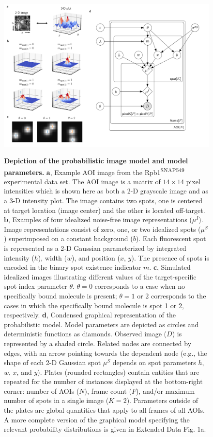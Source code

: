 \begin{figure}[h]
\centering
\includegraphics[width=\textwidth]{figures/figure2.png}
\label{fig:tapqir_model}
\caption{\textbf{Depiction of the probabilistic image model and model parameters.} \textbf{a}, Example AOI image from the Rpb1\textsuperscript{SNAP549} experimental data set. The AOI image is a matrix of $14 \times 14$ pixel intensities which is shown here as both a 2-D grayscale image and as a 3-D intensity plot. The image contains two spots, one is centered at target location (image center) and the other is located off-target. \textbf{b}, Examples of four idealized noise-free image representations ($\mu^I$). Image representations consist of zero, one, or two idealized spots ($\mu^S$) superimposed on a constant background ($b$). Each fluorescent spot is represented as a 2-D Gaussian parameterized by integrated intensity ($h$), width ($w$), and position ($x$, $y$). The presence of spots is encoded in the binary spot existence indicator $m$. \textbf{c}, Simulated idealized images illustrating different values of the target-specific spot index parameter $\theta$. $\theta = 0$ corresponds to a case when no specifically bound molecule is present; $\theta = 1$ or 2 corresponds to the cases in which the specifically bound molecule is spot 1 or 2, respectively. \textbf{d}, Condensed graphical representation of the probabilistic model. Model parameters are depicted as circles and deterministic functions as diamonds. Observed image ($D$) is represented by a shaded circle. Related nodes are connected by edges, with an arrow pointing towards the dependent node (e.g., the shape of each 2-D Gaussian spot $\mu^S$ depends on spot parameters $h$, $w$, $x$, and $y$). Plates (rounded rectangles) contain entities that are repeated for the number of instances displayed at the bottom-right corner: number of AOIs ($N$), frame count ($F$), and/or maximum number of spots in a single image ($K=2$). Parameters outside of the plates are global quantities that apply to all frames of all AOIs. A more complete version of the graphical model specifying the relevant probability distributions is given in Extended Data Fig. 1a. }
\end{figure}

